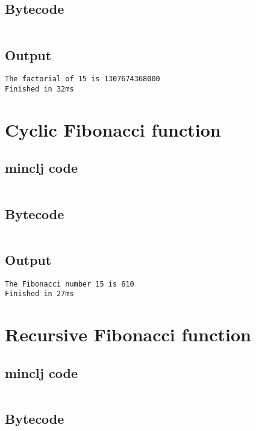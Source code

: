 \documentclass[11pt]{scrreprt}
\begin{document}
\subsection{Bytecode}
\inputminted{text}{/home/mario/git/MarioJim/miniclj/examples/recursive_factorial.mclj}

\subsection{Output}
\begin{verbatim}
The factorial of 15 is 1307674368000
Finished in 32ms
\end{verbatim}


\section{Cyclic Fibonacci function}
\subsection{minclj code}
\inputminted{clojure}{/home/mario/git/MarioJim/miniclj/examples/cyclic_fibonacci.clj}

\subsection{Bytecode}
\inputminted{text}{/home/mario/git/MarioJim/miniclj/examples/cyclic_fibonacci.mclj}

\subsection{Output}
\begin{verbatim}
The Fibonacci number 15 is 610
Finished in 27ms
\end{verbatim}


\section{Recursive Fibonacci function}
\subsection{minclj code}
\inputminted{clojure}{/home/mario/git/MarioJim/miniclj/examples/recursive_fibonacci.clj}

\subsection{Bytecode}
\inputminted{text}{/home/mario/git/MarioJim/miniclj/examples/recursive_fibonacci.mclj}
\end{document}
